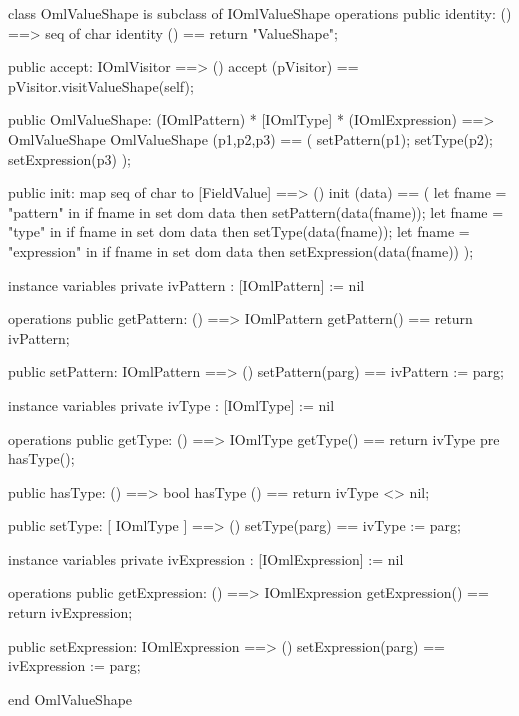\begin{vdm_al}
class OmlValueShape is subclass of IOmlValueShape
operations
  public identity: () ==> seq of char
  identity () == return "ValueShape";

  public accept: IOmlVisitor ==> ()
  accept (pVisitor) == pVisitor.visitValueShape(self);

  public OmlValueShape:
      (IOmlPattern) *
      [IOmlType] *
      (IOmlExpression) ==> OmlValueShape
  OmlValueShape (p1,p2,p3) == 
   ( setPattern(p1);
     setType(p2);
     setExpression(p3) );

  public init: map seq of char to [FieldValue] ==> ()
  init (data) ==
    ( let fname = "pattern" in
        if fname in set dom data
        then setPattern(data(fname));
      let fname = "type" in
        if fname in set dom data
        then setType(data(fname));
      let fname = "expression" in
        if fname in set dom data
        then setExpression(data(fname)) );

instance variables
  private ivPattern : [IOmlPattern] := nil

operations
  public getPattern: () ==> IOmlPattern
  getPattern() == return ivPattern;

  public setPattern: IOmlPattern ==> ()
  setPattern(parg) == ivPattern := parg;

instance variables
  private ivType : [IOmlType] := nil

operations
  public getType: () ==> IOmlType
  getType() == return ivType
    pre hasType();

  public hasType: () ==> bool
  hasType () == return ivType <> nil;

  public setType: [ IOmlType ] ==> ()
  setType(parg) == ivType := parg;

instance variables
  private ivExpression : [IOmlExpression] := nil

operations
  public getExpression: () ==> IOmlExpression
  getExpression() == return ivExpression;

  public setExpression: IOmlExpression ==> ()
  setExpression(parg) == ivExpression := parg;

end OmlValueShape
\end{vdm_al}

